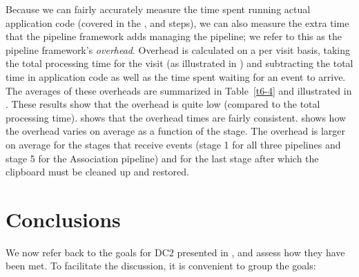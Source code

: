 Because we can fairly accurately measure the time spent running actual
application code (covered in the ,  and
 steps), we can also measure the extra time that
the pipeline framework adds managing the pipeline; we refer to this as
the pipeline framework's \textit{overhead}.  Overhead is calculated on a
per visit basis, taking the total processing time for the visit (as
illustrated in ) and subtracting the total time in
application code as well as the time spent waiting for an event to
arrive.  The averages of these overheads are summarized in
Table~\ref{t6-4} and illustrated in .  These results
show that the overhead is quite low (compared to the total processing
time).   shows that the overhead times are fairly
consistent.   shows how the overhead varies on
average as a function of the stage.  The overhead is larger on average
for the stages that receive events (stage 1 for all three pipelines
and stage 5 for the Association pipeline) and for the last stage after
which the clipboard must be cleaned up and restored.

\section{Conclusions}


We now refer back to the goals for DC2 presented in , and
assess how they have been met.  To facilitate the discussion, it is
convenient to group the goals:

